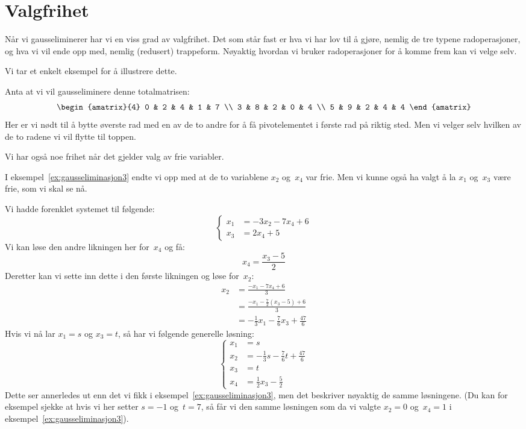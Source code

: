 \section*{Valgfrihet}

Når vi gausseliminerer har vi en viss grad av valgfrihet.  Det som
står fast er hva vi har lov til å gjøre, nemlig de tre typene
radoperasjoner, og hva vi vil ende opp med, nemlig (redusert)
trappeform.  Nøyaktig hvordan vi bruker radoperasjoner for å komme
frem kan vi velge selv.

Vi tar et enkelt eksempel for å illustrere dette.

\begin{ex}
Anta at vi vil gausseliminere denne totalmatrisen:
\[
\begin{amatrix}{4}
0 & 2 & 4 & 1 & 7 \\
3 & 8 & 2 & 0 & 4 \\
5 & 9 & 2 & 4 & 4
\end{amatrix}
\]
Her er vi nødt til å bytte øverste rad med en av de to andre for å få
pivotelementet i første rad på riktig sted.  Men vi velger selv
hvilken av de to radene vi vil flytte til toppen.
\end{ex}

Vi har også noe frihet når det gjelder valg av frie variabler.

\begin{ex}
I eksempel~\ref{ex:gausseliminasjon3} endte vi opp med at de to
variablene $x_2$ og~$x_4$ var frie.  Men vi kunne også ha valgt å la
$x_1$ og~$x_3$ være frie, som vi skal se nå.

Vi hadde forenklet systemet til følgende:
\[
\left\{
\begin{aligned}
x_1 &= - 3 x_2 - 7 x_4 + 6 \\
x_3 &= 2 x_4 + 5
\end{aligned}
\right.
\]
Vi kan løse den andre likningen her for~$x_4$ og få:
\[
x_4 = \frac{x_3 - 5}{2}
\]
Deretter kan vi sette inn dette i den første likningen og løse
for~$x_2$:
\begin{align*}
x_2
&= \frac{- x_1 - 7 x_4 + 6}{3} \\
&= \frac{- x_1 - \frac{7}{2} (x_3 - 5) + 6}{3} \\
&= - \frac{1}{3} x_1 - \frac{7}{6} x_3 + \frac{47}{6}
\end{align*}
Hvis vi nå lar $x_1 = s$ og $x_3 = t$, så har vi følgende generelle
løsning:
\[
\left\{
\begin{aligned}
x_1 &= s \\
x_2 &= - \frac{1}{3} s - \frac{7}{6} t + \frac{47}{6} \\
x_3 &= t \\
x_4 &= \frac{1}{2} x_3 - \frac{5}{2}
\end{aligned}
\right.
\]
Dette ser annerledes ut enn det vi fikk i
eksempel~\ref{ex:gausseliminasjon3}, men det beskriver nøyaktig de
samme løsningene.  (Du kan for eksempel sjekke at hvis vi her setter
$s=-1$ og~$t=7$, så får vi den samme løsningen som da vi valgte
$x_2=0$ og~$x_4=1$ i eksempel~\ref{ex:gausseliminasjon3}).
\end{ex}


\kapittelslutt
